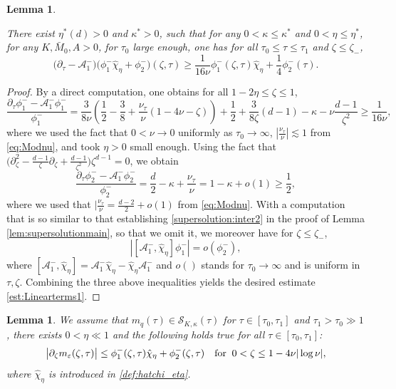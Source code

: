 \documentclass[11pt]{aims}
\newtheorem{lemma}[theorem]{Lemma}
\theoremstyle{definition}
\newcommand{\ep}{\varepsilon}
\newcommand{\Sc}{\mathcal{S}}
\newcommand{\As}{\mathscr{A}}
\newcommand{\pa}{\partial}
\newcommand{\be}{\begin{equation}}
\newcommand{\ee}{\end{equation}}
\numberwithin{equation}{section}
\begin{document}
\begin{lemma} \label{lem:supersolutionmainleft}

There exist $\eta^*(d)>0$ and $\kappa^*>0$, such that for any $0<\kappa\leq \kappa^*$ and $0<\eta\leq \eta^*$, for any $K,\bar M_0,A>0$, for $\tau_0$ large enough, one has for all $ \tau_0\leq \tau \leq \tau_1$ and $\zeta \leq  \zeta_-$,
\begin{equation}\label{est:Linearterms1}
\big( \pa_\tau - \As_1^-\big) \big(\phi_1^- \hat \chi_{\eta}+ \phi_2^- \big)(\zeta,\tau)  \geq  \frac{1}{16 \nu}\phi_1^-(\zeta, \tau) \hat \chi_{\eta} + \frac 14 \phi_2^-(\tau).
\end{equation}

\end{lemma}


\begin{proof}

By a direct computation, one obtains for all $ 1-2\eta \leq \zeta \leq 1$,
$$
\frac{\pa_\tau \phi_1^--\As_1^- \phi_1^-}{\phi_1^-} = \frac{3}{8\nu} \left( \frac 12-\frac 38+\frac{\nu_\tau}{\nu}(1-4\nu-\zeta)\right)+\frac 12 +\frac{3}{8\zeta}(d-1)-\kappa-\nu\frac{d-1}{\zeta^2} \geq \frac{1}{16 \nu},
$$
where we used the fact that $0<\nu \to 0$ uniformly as $\tau_0\to \infty$, $|\frac{\nu_\tau}{\nu}|\lesssim 1 $ from \eqref{eq:Modnu}, and took $\eta>0$ small enough. Using the fact that $\Big(\pa_\zeta^2 - \frac{d - 1}{\zeta} \pa_\zeta + \frac{d-1}{\zeta^2}   \Big) \zeta^{d-1} = 0$, we obtain
\be \label{bdbdbd}
\frac{\pa_\tau \phi_2^--\As_1^- \phi_2^-}{\phi_2^-}=\frac d2-\kappa+\frac{\nu_\tau}{\nu}=1-\kappa+o(1)\geq \frac 12,
\ee
where we used that $|\frac{\nu_\tau}{\nu}=\frac{d-2}{2}+o(1) $ from \eqref{eq:Modnu}. With a computation that is so similar to that establishing \eqref{supersolution:inter2} in the proof of Lemma \ref{lem:supersolutionmain}, so that we omit it, we moreover have for $\zeta \leq \zeta_-$,
$$
|[\As_1^- ,\hat \chi_\eta]\phi_1^-| =o(\phi_2^-),
$$
where $[\As_1^- ,\hat \chi_\eta]=\As_1^- \hat \chi_\eta-\hat \chi_\eta \As_1^-$ and $o()$ stands for $\tau_0\to \infty$ and is uniform in $\tau,\zeta$. Combining the three above inequalities yields the desired estimate \eqref{est:Linearterms1}.
\end{proof}




\begin{lemma} \label{lemm:mep_out} We assume that  $m_q(\tau) \in \Sc_{K, \kappa}(\tau)$ for $\tau \in [\tau_0 , \tau_1]$ and $\tau_1 > \tau_0 \gg 1$, there exists $0 < \eta  \ll 1$ and the following holds true for all $\tau \in [\tau_0, \tau_1]$:
\begin{equation}\label{est:mep_out}
\big|\pa_\zeta m_\ep (\zeta, \tau)\big| \leq \phi_1^-(\zeta, \tau)  \hat \chi_{\eta}+ \phi_2^-(\zeta,\tau) \quad  \textup{for}\;\; 0 < \zeta \leq 1 - 4\nu |\log \nu|,
\end{equation}
where $\hat \chi_{\eta}$ is introduced in \eqref{def:hatchi_eta}. 
\end{lemma}
\end{document}
